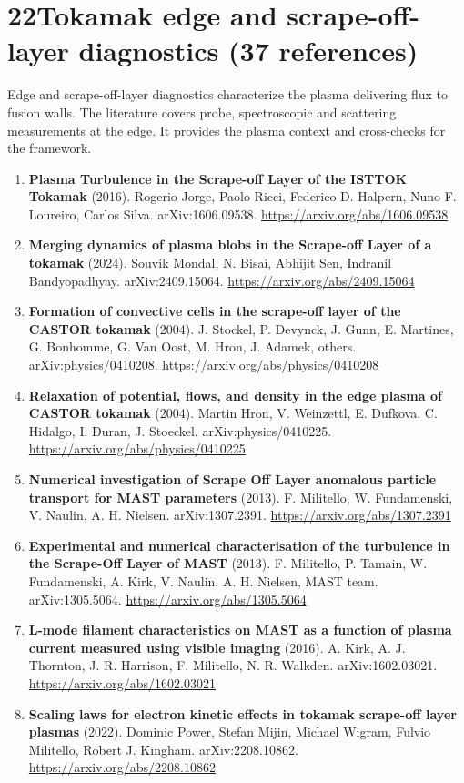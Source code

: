 \documentclass[11pt,a4paper]{article}
\begin{document}
\section*{22\quad Tokamak edge and scrape-off-layer diagnostics \textnormal{(\normalsize 37 references)}}
Edge and scrape-off-layer diagnostics characterize the plasma delivering flux to fusion walls. The literature covers probe, spectroscopic and scattering measurements at the edge. It provides the plasma context and cross-checks for the framework.
\begin{enumerate}[leftmargin=1.4em]
\item \textbf{Plasma Turbulence in the Scrape-off Layer of the ISTTOK Tokamak} (2016). Rogerio Jorge, Paolo Ricci, Federico D. Halpern, Nuno F. Loureiro, Carlos Silva. arXiv:1606.09538. \url{https://arxiv.org/abs/1606.09538}
\item \textbf{Merging dynamics of plasma blobs in the Scrape-off Layer of a tokamak} (2024). Souvik Mondal, N. Bisai, Abhijit Sen, Indranil Bandyopadhyay. arXiv:2409.15064. \url{https://arxiv.org/abs/2409.15064}
\item \textbf{Formation of convective cells in the scrape-off layer of the CASTOR tokamak} (2004). J. Stockel, P. Devynck, J. Gunn, E. Martines, G. Bonhomme, G. Van Oost, M. Hron, J. Adamek, others. arXiv:physics/0410208. \url{https://arxiv.org/abs/physics/0410208}
\item \textbf{Relaxation of potential, flows, and density in the edge plasma of CASTOR tokamak} (2004). Martin Hron, V. Weinzettl, E. Dufkova, C. Hidalgo, I. Duran, J. Stoeckel. arXiv:physics/0410225. \url{https://arxiv.org/abs/physics/0410225}
\item \textbf{Numerical investigation of Scrape Off Layer anomalous particle transport for MAST parameters} (2013). F. Militello, W. Fundamenski, V. Naulin, A. H. Nielsen. arXiv:1307.2391. \url{https://arxiv.org/abs/1307.2391}
\item \textbf{Experimental and numerical characterisation of the turbulence in the Scrape-Off Layer of MAST} (2013). F. Militello, P. Tamain, W. Fundamenski, A. Kirk, V. Naulin, A. H. Nielsen, MAST team. arXiv:1305.5064. \url{https://arxiv.org/abs/1305.5064}
\item \textbf{L-mode filament characteristics on MAST as a function of plasma current measured using visible imaging} (2016). A. Kirk, A. J. Thornton, J. R. Harrison, F. Militello, N. R. Walkden. arXiv:1602.03021. \url{https://arxiv.org/abs/1602.03021}
\item \textbf{Scaling laws for electron kinetic effects in tokamak scrape-off layer plasmas} (2022). Dominic Power, Stefan Mijin, Michael Wigram, Fulvio Militello, Robert J. Kingham. arXiv:2208.10862. \url{https://arxiv.org/abs/2208.10862}

\end{enumerate}
\end{document}
